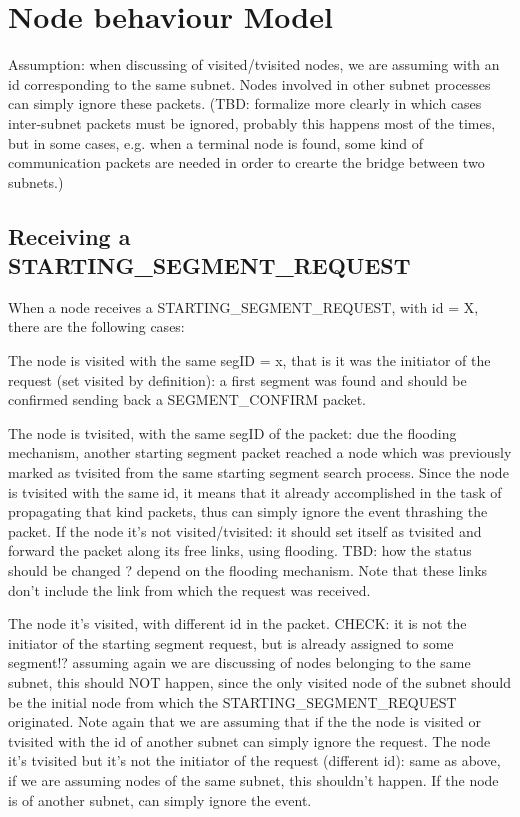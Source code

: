 \documentclass[conference]{IEEEtran}
\begin{document}
\section{Node behaviour Model}
Assumption: when discussing of
visited/tvisited nodes, we are assuming with an id corresponding to
the same subnet. Nodes involved in other subnet processes can simply
ignore these packets. (TBD: formalize more clearly in which cases
inter-subnet packets must be ignored, probably this happens most of
the times, but in some cases, e.g. when a terminal node is found, some
kind of communication packets are needed in order to crearte the
bridge between two subnets.) 

\subsection{Receiving a STARTING\_SEGMENT\_REQUEST}

When a node receives a STARTING\_SEGMENT\_REQUEST, with id = X,  there are the following cases:

The node is visited with the same segID = x, that is it was the
initiator of the request (set visited by definition): a first segment
was found and should be confirmed sending back a SEGMENT\_CONFIRM
packet.  

The node is tvisited, with the same segID of the packet: due
the flooding mechanism, another starting segment packet reached a node
which was previously marked as tvisited from the same starting segment
search process. Since the node is tvisited with the same id, it means
that it already accomplished in the task of propagating that kind
packets, thus can simply ignore the event thrashing the packet.  If
the node it's not visited/tvisited: it should set itself as tvisited
and forward the packet along its free links, using flooding. TBD: how
the status should be changed ? depend on the flooding mechanism. Note
that these links don’t include the link from which the request was
received.  

The node it's visited, with different id in the packet.
CHECK:  it is not the initiator of the starting segment request, but
is already assigned to some segment!? assuming again we are discussing
of nodes belonging to the same subnet, this should NOT happen, since
the only visited node of the subnet should be the initial node from
which the STARTING\_SEGMENT\_REQUEST originated. Note again that we are
assuming that if the the node is visited or tvisited with the id of
another subnet can simply ignore the request.  The node it's tvisited
but it's not the initiator of the request (different id): same as
above, if we are assuming nodes of the same subnet, this shouldn’t
happen. If the node is of another subnet, can simply ignore the event.
\end{document}
